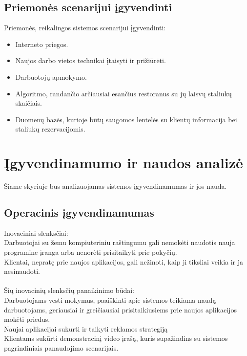 \documentclass{VUMIFPSkursinis}
\begin{document}
\subsection{Priemonės scenarijui įgyvendinti}

Priemonės, reikalingos sistemos scenarijui įgyvendinti:
\begin{itemize}
\item Interneto priegos.
\item Naujos darbo vietos technikai įtaisyti ir prižiūrėti.
\item Darbuotojų apmokymo.
\item Algoritmo, randančio arčiausiai esančius restoranus su jų laisvų staliukų skaičiais.
\item Duomenų bazės, kurioje būtų saugomos lentelės su klientų informacija bei staliukų rezervacijomis.

\end{itemize}

 \section{Įgyvendinamumo ir naudos analizė}
Šiame skyriuje bus analizuojamas sistemos įgyvendinamumas ir jos nauda.
\subsection{Operacinis įgyvendinamumas}
Inovaciniai slenksčiai:\\
Darbuotojai su žemu kompiuteriniu raštingumu gali nemokėti naudotis nauja programine įranga arba
nenorėti prisitaikyti prie pokyčių.\\
Klientai, nepratę prie naujos aplikacijos, gali nežinoti, kaip ji tiksliai veikia ir ja nesinaudoti.\\
\\
Šių inovacinių slenksčių panaikinimo būdai:\\
Darbuotojams vesti mokymus, paaiškinti apie sistemos teikiama naudą darbuotojams, geriausiai ir
greičiausiai prisitaikiusiems prie naujos aplikacijos mokėti priedus.\\
Naujai aplikacijai sukurti ir taikyti reklamos strategiją\\
Klientams sukūrti demonstracinį video įrašą, kuris supažindins su sistemos pagrindiniais panaudojimo scenarijais.
\end{document}

